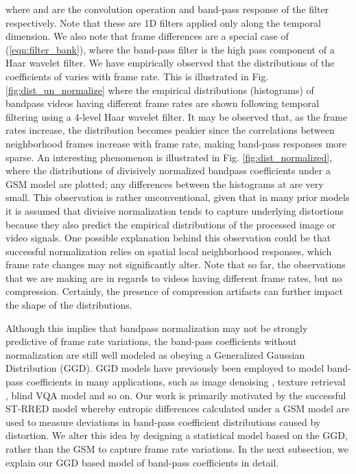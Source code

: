 \documentclass[journal]{IEEEtran}
\begin{document}
where  and  are the convolution operation and band-pass response of the  filter respectively. Note that these are 1D filters applied only along the temporal dimension. We also note that frame differences are a special case of (\ref{eqn:filter_bank}), where the band-pass filter is the high pass component of a Haar wavelet filter. We have empirically observed that the distributions of the coefficients of  varies with frame rate. This is illustrated in Fig. \ref{fig:dist_un_normalize} where the empirical distributions (histograms) of bandpass videos having different frame rates are shown following temporal filtering using a 4-level Haar wavelet filter. It may be observed that, as the frame rates increase, the distribution becomes peakier since the correlations between neighborhood frames increase with frame rate, making band-pass responses more sparse. An interesting phenomenon is illustrated in Fig. \ref{fig:dist_normalized}, where the distributions of divisively normalized bandpass coefficients under a GSM model are plotted; any differences between the histograms at are very small. This observation is rather unconventional, given that in many prior models \cite{mittal2012no,mittal2013making,soundararajan2012video,bampis2017speed} it is assumed that divisive normalization tends to capture underlying distortions because they also predict the empirical distributions of the processed image or video signals. One possible explanation behind this observation could be that successful normalization relies on spatial local neighborhood responses, which frame rate changes may not significantly alter. Note that so far, the observations that we are making are in regards to videos having different frame rates, but no compression. Certainly, the presence of compression artifacts can further impact the shape of the distributions.

Although this implies that bandpass normalization may not be strongly predictive of frame rate variations, the band-pass coefficients without normalization are still well modeled as obeying a Generalized Gaussian Distribution (GGD). GGD models have previously been employed to model band-pass coefficients in many applications, such as image denoising \cite{chang2000adaptive}, texture retrieval \cite{do2002wavelet}, blind VQA model \cite{saad2014blind} and so on. Our work is primarily motivated by the successful ST-RRED model \cite{soundararajan2012rred} whereby entropic differences calculated under a GSM model are used to measure deviations in band-pass coefficient distributions caused by distortion. We alter this idea by designing a statistical model based on the GGD, rather than the GSM to capture frame rate variations. In the next subsection, we explain our GGD based model of band-pass coefficients in detail.
\end{document}
